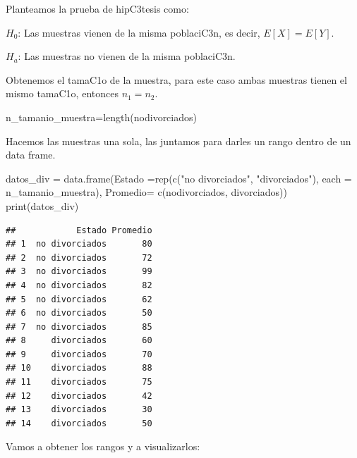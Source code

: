 \documentclass[
]{article}
\newenvironment{Shaded}{\begin{snugshade}}{\end{snugshade}}
\newcommand{\AttributeTok}[1]{\textcolor[rgb]{0.77,0.63,0.00}{#1}}
\newcommand{\FunctionTok}[1]{\textcolor[rgb]{0.00,0.00,0.00}{#1}}
\newcommand{\NormalTok}[1]{#1}
\newcommand{\OtherTok}[1]{\textcolor[rgb]{0.56,0.35,0.01}{#1}}
\newcommand{\SpecialCharTok}[1]{\textcolor[rgb]{0.00,0.00,0.00}{#1}}
\newcommand{\StringTok}[1]{\textcolor[rgb]{0.31,0.60,0.02}{#1}}
\begin{document}
Planteamos la prueba de hipC3tesis como:

\(H_{0}\): Las muestras vienen de la misma poblaciC3n, es decir,
\(E[X]=E[Y]\).

\(H_{a}\): Las muestras no vienen de la misma poblaciC3n.

Obtenemos el tamaC1o de la muestra, para este caso ambas muestras tienen
el mismo tamaC1o, entonces \(n_{1}=n_{2}\).

\begin{Shaded}
\begin{Highlighting}[]
\NormalTok{n\_tamanio\_muestra}\OtherTok{=}\FunctionTok{length}\NormalTok{(nodivorciados)}
\end{Highlighting}
\end{Shaded}

Hacemos las muestras una sola, las juntamos para darles un rango dentro
de un data frame.

\begin{Shaded}
\begin{Highlighting}[]
\NormalTok{datos\_div }\OtherTok{=} \FunctionTok{data.frame}\NormalTok{(}\AttributeTok{Estado =}\FunctionTok{rep}\NormalTok{(}\FunctionTok{c}\NormalTok{(}\StringTok{"no divorciados"}\NormalTok{, }\StringTok{"divorciados"}\NormalTok{), }
                              \AttributeTok{each =}\NormalTok{ n\_tamanio\_muestra),}
                              \AttributeTok{Promedio=} \FunctionTok{c}\NormalTok{(nodivorciados, divorciados))}
\FunctionTok{print}\NormalTok{(datos\_div)}
\end{Highlighting}
\end{Shaded}

\begin{verbatim}
##            Estado Promedio
## 1  no divorciados       80
## 2  no divorciados       72
## 3  no divorciados       99
## 4  no divorciados       82
## 5  no divorciados       62
## 6  no divorciados       50
## 7  no divorciados       85
## 8     divorciados       60
## 9     divorciados       70
## 10    divorciados       88
## 11    divorciados       75
## 12    divorciados       42
## 13    divorciados       30
## 14    divorciados       50
\end{verbatim}

Vamos a obtener los rangos y a visualizarlos:

\begin{Shaded}
\end{Shaded}
\end{document}
